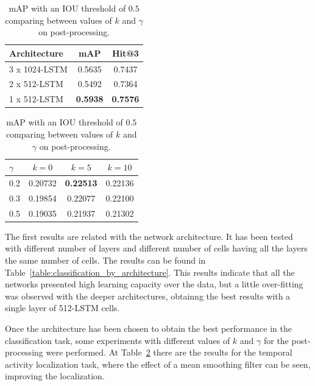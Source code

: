 \documentclass{article}
\begin{document}
\begin{table}[h]
    \parbox{.45\linewidth}{
        \centering
        \begin{tabular}{l|cc}
        \textbf{Architecture} & \textbf{mAP} & \textbf{Hit@3} \\
        \hline
        3 x 1024-LSTM & 0.5635 & 0.7437 \\
        2 x 512-LSTM & 0.5492 & 0.7364 \\
        1 x 512-LSTM & \bf0.5938 & \bf0.7576 \\
        \end{tabular}
        \vspace{.5cm}
        \caption{Results for classification task comparing different architectures.}
        \label{table:classification_by_architecture}
    }
    \hfill
    \parbox{.45\linewidth}{
        \centering
        \begin{tabular}{l|ccc}
        \textbf{$\gamma$} & \textbf{$k=0$} & \textbf{$k=5$} & \textbf{$k=10$} \\
        \hline
        0.2 & 0.20732 & \bf0.22513 & 0.22136 \\
        0.3 & 0.19854 & 0.22077 & 0.22100 \\
        0.5 & 0.19035 & 0.21937 & 0.21302 \\
        \end{tabular}
        \vspace{.2cm}
        \caption{mAP with an IOU threshold of $0.5$ comparing between values of $k$ and $\gamma$ on post-processing.}
        \label{table:detection_postprocessing_comparison}
    }
\end{table}

The first results are related with the network architecture. It has been tested with different number of layers and different number of cells having all the layers the same number of cells. The results can be found in Table~\ref{table:classification_by_architecture}.
This results indicate that all the networks presented high learning capacity over the data, but a little over-fitting was observed with the deeper architectures, obtainng the best results with a single layer of 512-LSTM cells.

Once the architecture has been chosen to obtain the best performance in the classification task, some experiments with different values of $k$ and $\gamma$ for the post-processing were performed.
At Table~\ref{table:detection_postprocessing_comparison} there are the results for the temporal activity localization task, where the effect of a mean smoothing filter can be seen, improving the localization.
\end{document}
